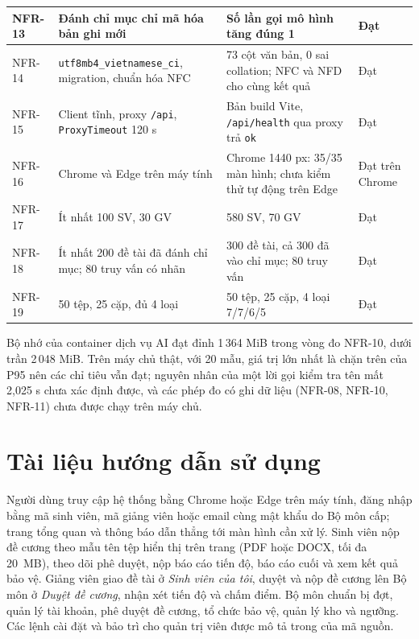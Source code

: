 \documentclass[../main.tex]{subfiles}
\begin{document}
{\begin{longtable}{|p{1.5cm}|p{4.4cm}|p{6.6cm}|p{1.7cm}|}
\hline
NFR-13 & Đánh chỉ mục chỉ mã hóa bản ghi mới & Số lần gọi mô hình tăng đúng 1 & Đạt \\
\hline
NFR-14 & \texttt{utf8mb4\_\allowbreak vietnamese\_ci}, migration, chuẩn hóa NFC & 73 cột văn bản, 0 sai collation; NFC và NFD cho cùng kết quả & Đạt \\
\hline
NFR-15 & Client tĩnh, proxy \texttt{/api}, \texttt{ProxyTimeout} 120 s & Bản build Vite, \texttt{/api/health} qua proxy trả \texttt{ok} & Đạt \\
\hline
NFR-16 & Chrome và Edge trên máy tính & Chrome 1440 px: 35/35 màn hình; chưa kiểm thử tự động trên Edge & Đạt trên Chrome \\
\hline
NFR-17 & Ít nhất 100 SV, 30 GV & 580 SV, 70 GV & Đạt \\
\hline
NFR-18 & Ít nhất 200 đề tài đã đánh chỉ mục; 80 truy vấn có nhãn & 300 đề tài, cả 300 đã vào chỉ mục; 80 truy vấn & Đạt \\
\hline
NFR-19 & 50 tệp, 25 cặp, đủ 4 loại & 50 tệp, 25 cặp, 4 loại 7/7/6/5 & Đạt \\
\hline
\end{longtable}
}

Bộ nhớ của container dịch vụ AI đạt đỉnh 1\,364 MiB trong vòng đo NFR-10, dưới trần 2\,048 MiB. Trên máy chủ thật, với 20 mẫu, giá trị lớn nhất là chặn trên của P95 nên các chỉ tiêu vẫn đạt; nguyên nhân của một lời gọi kiểm tra tên mất 2,025 s chưa xác định được, và các phép đo có ghi dữ liệu (NFR-08, NFR-10, NFR-11) chưa được chạy trên máy chủ.

\section{Tài liệu hướng dẫn sử dụng}\label{sec:c4-huong-dan}

Người dùng truy cập hệ thống bằng Chrome hoặc Edge trên máy tính, đăng nhập bằng mã sinh viên, mã giảng viên hoặc email cùng mật khẩu do Bộ môn cấp; trang tổng quan và thông báo dẫn thẳng tới màn hình cần xử lý. Sinh viên nộp đề cương theo mẫu tên tệp hiển thị trên trang (PDF hoặc DOCX, tối đa 20~MB), theo dõi phê duyệt, nộp báo cáo tiến độ, báo cáo cuối và xem kết quả bảo vệ. Giảng viên giao đề tài ở \textit{Sinh viên của tôi}, duyệt và nộp đề cương lên Bộ môn ở \textit{Duyệt đề cương}, nhận xét tiến độ và chấm điểm. Bộ môn chuẩn bị đợt, quản lý tài khoản, phê duyệt đề cương, tổ chức bảo vệ, quản lý kho và ngưỡng. Các lệnh cài đặt và bảo trì cho quản trị viên được mô tả trong  của mã nguồn.
\end{document}
